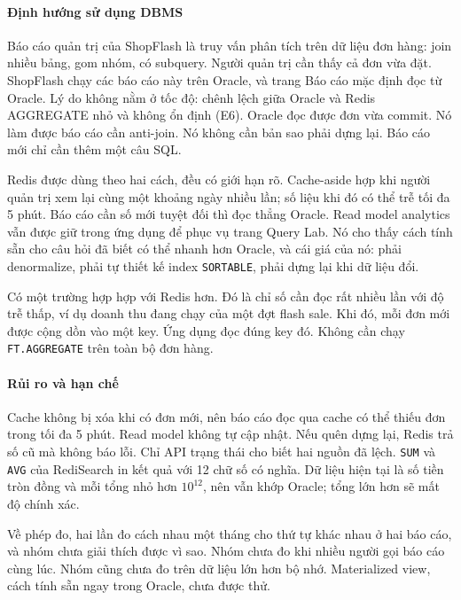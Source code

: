 \paragraph{Định hướng sử dụng DBMS}\label{sec:q-direction}

Báo cáo quản trị của ShopFlash là truy vấn phân tích trên dữ liệu đơn hàng: join nhiều bảng, gom nhóm, có subquery. Người quản trị cần thấy cả đơn vừa đặt. ShopFlash chạy các báo cáo này trên Oracle, và trang Báo cáo mặc định đọc từ Oracle. Lý do không nằm ở tốc độ: chênh lệch giữa Oracle và Redis AGGREGATE nhỏ và không ổn định (E6). Oracle đọc được đơn vừa commit. Nó làm được báo cáo cần anti-join. Nó không cần bản sao phải dựng lại. Báo cáo mới chỉ cần thêm một câu SQL.

Redis được dùng theo hai cách, đều có giới hạn rõ. Cache-aside hợp khi người quản trị xem lại cùng một khoảng ngày nhiều lần; số liệu khi đó có thể trễ tối đa 5 phút. Báo cáo cần số mới tuyệt đối thì đọc thẳng Oracle. Read model analytics vẫn được giữ trong ứng dụng để phục vụ trang Query Lab. Nó cho thấy cách tính sẵn cho câu hỏi đã biết có thể nhanh hơn Oracle, và cái giá của nó: phải denormalize, phải tự thiết kế index \texttt{SORTABLE}, phải dựng lại khi dữ liệu đổi.

Có một trường hợp hợp với Redis hơn. Đó là chỉ số cần đọc rất nhiều lần với độ trễ thấp, ví dụ doanh thu đang chạy của một đợt flash sale. Khi đó, mỗi đơn mới được cộng dồn vào một key. Ứng dụng đọc đúng key đó. Không cần chạy \texttt{FT.AGGREGATE} trên toàn bộ đơn hàng.

\paragraph{Rủi ro và hạn chế}\label{sec:q-risks}

Cache không bị xóa khi có đơn mới, nên báo cáo đọc qua cache có thể thiếu đơn trong tối đa 5 phút. Read model không tự cập nhật. Nếu quên dựng lại, Redis trả số cũ mà không báo lỗi. Chỉ API trạng thái cho biết hai nguồn đã lệch. \texttt{SUM} và \texttt{AVG} của RediSearch in kết quả với 12 chữ số có nghĩa. Dữ liệu hiện tại là số tiền tròn đồng và mỗi tổng nhỏ hơn $10^{12}$, nên vẫn khớp Oracle; tổng lớn hơn sẽ mất độ chính xác.

Về phép đo, hai lần đo cách nhau một tháng cho thứ tự khác nhau ở hai báo cáo, và nhóm chưa giải thích được vì sao. Nhóm chưa đo khi nhiều người gọi báo cáo cùng lúc. Nhóm cũng chưa đo trên dữ liệu lớn hơn bộ nhớ. Materialized view, cách tính sẵn ngay trong Oracle, chưa được thử.

